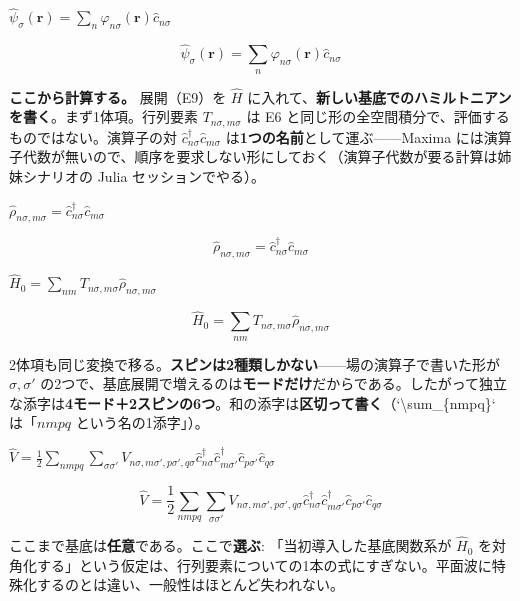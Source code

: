 \documentclass[dvipdfmx,a4paper,11pt]{jsarticle}
\begin{document}
$\hat\psi_\sigma(\mathbf{r}) = \sum_n \varphi_{n\sigma}(\mathbf{r}) \hat c_{n\sigma}$

\begin{equation}
  \hat\psi_\sigma(\mathbf{r}) = \sum_n \varphi_{n\sigma}(\mathbf{r}) \hat c_{n\sigma}
  \label{eq:E9}
\end{equation}

\textbf{ここから計算する。} 展開（E9）を $\hat H$ に入れて、\textbf{新しい基底でのハミルトニアンを書く}。まず1体項。行列要素 $T_{n\sigma,m\sigma}$ は E6 と同じ形の全空間積分で、評価するものではない。演算子の対 $\hat c^\dagger_{n\sigma}\hat c_{m\sigma}$ は\textbf{1つの名前}として運ぶ——Maxima には演算子代数が無いので、順序を要求しない形にしておく（演算子代数が要る計算は姉妹シナリオの Julia セッションでやる）。

$\hat\rho_{n\sigma,m\sigma} = \hat c^\dagger_{n\sigma} \hat c_{m\sigma}$

\begin{equation}
  \hat\rho_{n\sigma,m\sigma} = \hat c^\dagger_{n\sigma} \hat c_{m\sigma}
  \label{eq:E10}
\end{equation}

$\hat H_0 = \sum_{n m} T_{n\sigma,m\sigma} \hat\rho_{n\sigma,m\sigma}$

\begin{equation}
  \hat H_0 = \sum_{n m} T_{n\sigma,m\sigma} \hat\rho_{n\sigma,m\sigma}
  \label{eq:E11}
\end{equation}

2体項も同じ変換で移る。\textbf{スピンは2種類しかない}——場の演算子で書いた形が $\sigma,\sigma'$ の2つで、基底展開で増えるのは\textbf{モードだけ}だからである。したがって独立な添字は\textbf{4モード＋2スピンの6つ}。和の添字は\textbf{区切って書く}（`\textbackslash{}sum\_\{nmpq\}` は「$nmpq$ という名の1添字」）。

$\hat V = \frac{1}{2}\sum_{n m p q}\sum_{\sigma \sigma'} V_{n\sigma,m\sigma',p\sigma',q\sigma} \hat c^\dagger_{n\sigma} \hat c^\dagger_{m\sigma'} \hat c_{p\sigma'} \hat c_{q\sigma}$

\begin{equation}
  \hat V = \frac{1}{2}\sum_{n m p q}\sum_{\sigma \sigma'} V_{n\sigma,m\sigma',p\sigma',q\sigma} \hat c^\dagger_{n\sigma} \hat c^\dagger_{m\sigma'} \hat c_{p\sigma'} \hat c_{q\sigma}
  \label{eq:E12}
\end{equation}

ここまで基底は\textbf{任意}である。ここで\textbf{選ぶ}: 「当初導入した基底関数系が $\hat H_0$ を対角化する」という仮定は、行列要素についての1本の式にすぎない。平面波に特殊化するのとは違い、一般性はほとんど失われない。
\end{document}
